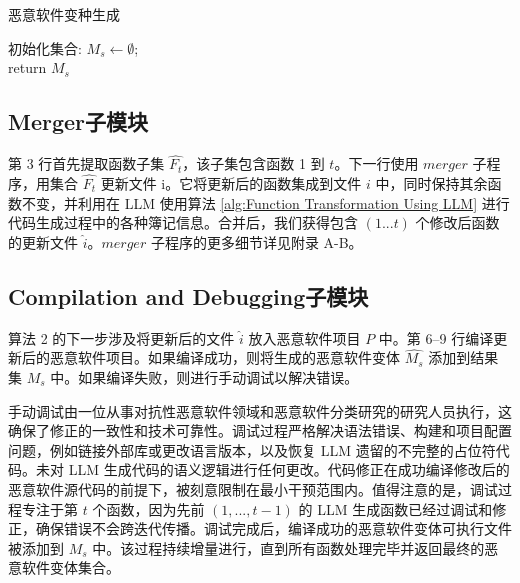 \begin{algorithm}[htbp]
	\caption{恶意软件变种生成\label{alg:Malware Variant Generation}}
    初始化集合: $M_s \leftarrow \emptyset$;\\
    return $M_{s}$
\end{algorithm}

\subsection{Merger子模块}
第 3 行首先提取函数子集 $\hat{F_{t}}$，该子集包含函数 1 到 $t$。下一行使用 $merger$ 子程序，用集合 $\hat{F_{t}}$ 更新文件 i。它将更新后的函数集成到文件 $i$ 中，同时保持其余函数不变，并利用在 LLM 使用算法 \ref{alg:Function Transformation Using LLM} 进行代码生成过程中的各种簿记信息。合并后，我们获得包含 $(1...t)$ 个修改后函数的更新文件 $\hat{i}$。$merger$ 子程序的更多细节详见附录 A-B。

\subsection{Compilation and Debugging子模块}
算法 2 的下一步涉及将更新后的文件 $\hat{i}$ 放入恶意软件项目 $P$ 中。第 6–9 行编译更新后的恶意软件项目。如果编译成功，则将生成的恶意软件变体 $\hat{M_{s}}$ 添加到结果集 $M_{s}$ 中。如果编译失败，则进行手动调试以解决错误。

手动调试由一位从事对抗性恶意软件领域和恶意软件分类研究的研究人员执行，这确保了修正的一致性和技术可靠性。调试过程严格解决语法错误、构建和项目配置问题，例如链接外部库或更改语言版本，以及恢复 LLM 遗留的不完整的占位符代码。未对 LLM 生成代码的语义逻辑进行任何更改。代码修正在成功编译修改后的恶意软件源代码的前提下，被刻意限制在最小干预范围内。值得注意的是，调试过程专注于第 $t$ 个函数，因为先前 $(1,...,t − 1)$ 的 LLM 生成函数已经过调试和修正，确保错误不会跨迭代传播。调试完成后，编译成功的恶意软件变体可执行文件被添加到 $M_{s}$ 中。该过程持续增量进行，直到所有函数处理完毕并返回最终的恶意软件变体集合。

